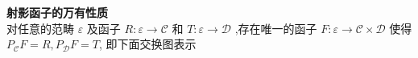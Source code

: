 \documentclass{article}
\begin{document}
\begin{flushleft}
\textbf{射影函子的万有性质} \\
对任意的范畴 $\varepsilon$ 及函子 $R\colon \varepsilon \rightarrow \mathcal{C}$    和 $T\colon \varepsilon \rightarrow \mathcal{D}$ ,存在唯一的函子 $F\colon \varepsilon \rightarrow \mathcal{C}\times\mathcal{D}$ 使得 $P_{\mathcal{C}}F=R,P_{\mathcal{D}}F=T$, 即下面交换图表示
\end{flushleft}

\begin{center}
\end{center}
\end{document}
